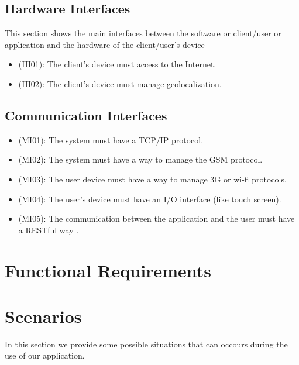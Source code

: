\documentclass[a4paper,leqno]{book}
\begin{document}
\subsection{Hardware Interfaces}
This section shows the main interfaces between the software or client/user or application and the hardware of the client/user's device

\begin{itemize}
\item (HI01): The client's device must access to the Internet.
\item (HI02): The client's device must manage geolocalization. 
\end{itemize}

\subsection{Communication Interfaces}

\begin{itemize}
\item (MI01): The system must have a TCP/IP protocol.
\item (MI02): The system must have a way to manage the GSM protocol.
\item (MI03): The user device must have a way to manage 3G or wi-fi protocols.
\item (MI04): The user's device must have an I/O interface (like touch screen).
\item (MI05): The communication between the application and the user must have a RESTful way .
\end{itemize}

\section{Functional Requirements}


\section{Scenarios}
In this section we provide some possible situations that can occours during the use of our application.
\end{document}
